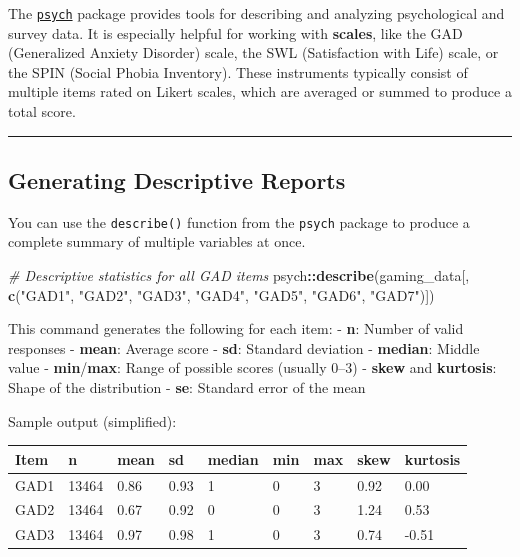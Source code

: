 \documentclass[
]{book}
\newenvironment{Shaded}{\begin{snugshade}}{\end{snugshade}}
\newcommand{\CommentTok}[1]{\textcolor[rgb]{0.56,0.35,0.01}{\textit{#1}}}
\newcommand{\FunctionTok}[1]{\textcolor[rgb]{0.13,0.29,0.53}{\textbf{#1}}}
\newcommand{\NormalTok}[1]{#1}
\newcommand{\SpecialCharTok}[1]{\textcolor[rgb]{0.81,0.36,0.00}{\textbf{#1}}}
\newcommand{\StringTok}[1]{\textcolor[rgb]{0.31,0.60,0.02}{#1}}
\begin{document}
The \href{https://cran.r-project.org/web/packages/psych/}{\texttt{psych}} package provides tools for describing and analyzing psychological and survey data. It is especially helpful for working with \textbf{scales}, like the GAD (Generalized Anxiety Disorder) scale, the SWL (Satisfaction with Life) scale, or the SPIN (Social Phobia Inventory). These instruments typically consist of multiple items rated on Likert scales, which are averaged or summed to produce a total score.

\begin{center}\rule{0.5\linewidth}{0.5pt}\end{center}

\subsection*{\texorpdfstring{\textbf{Generating Descriptive Reports}}{Generating Descriptive Reports}}\label{generating-descriptive-reports}

You can use the \texttt{describe()} function from the \texttt{psych} package to produce a complete summary of multiple variables at once.

\begin{Shaded}
\begin{Highlighting}[]
\CommentTok{\# Descriptive statistics for all GAD items}
\NormalTok{psych}\SpecialCharTok{::}\FunctionTok{describe}\NormalTok{(gaming\_data[, }\FunctionTok{c}\NormalTok{(}\StringTok{"GAD1"}\NormalTok{, }\StringTok{"GAD2"}\NormalTok{, }\StringTok{"GAD3"}\NormalTok{, }\StringTok{"GAD4"}\NormalTok{, }\StringTok{"GAD5"}\NormalTok{, }\StringTok{"GAD6"}\NormalTok{, }\StringTok{"GAD7"}\NormalTok{)])}
\end{Highlighting}
\end{Shaded}

This command generates the following for each item: - \textbf{n}: Number of valid responses - \textbf{mean}: Average score - \textbf{sd}: Standard deviation - \textbf{median}: Middle value - \textbf{min}/\textbf{max}: Range of possible scores (usually 0--3) - \textbf{skew} and \textbf{kurtosis}: Shape of the distribution - \textbf{se}: Standard error of the mean

Sample output (simplified):

\begin{longtable}[]{@{}lllllllll@{}}
\toprule\noalign{}
Item & n & mean & sd & median & min & max & skew & kurtosis \\
\midrule\noalign{}
\endhead
\bottomrule\noalign{}
\endlastfoot
GAD1 & 13464 & 0.86 & 0.93 & 1 & 0 & 3 & 0.92 & 0.00 \\
GAD2 & 13464 & 0.67 & 0.92 & 0 & 0 & 3 & 1.24 & 0.53 \\
GAD3 & 13464 & 0.97 & 0.98 & 1 & 0 & 3 & 0.74 & -0.51 \\
\end{longtable}
\end{document}
